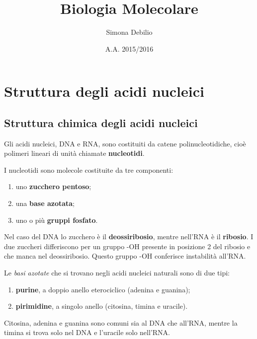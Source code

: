 \documentclass[11pt]{book}
\title{\textbf{Biologia Molecolare}}
\author{Simona Debilio}
\date{A.A. 2015/2016}
\date{}
\begin{document}
\maketitle

\tableofcontents


\chapter{Struttura degli acidi
nucleici}\label{struttura-degli-acidi-nucleici}

\section{Struttura chimica degli acidi
nucleici}\label{struttura-chimica-degli-acidi-nucleici}

Gli acidi nucleici, DNA e RNA, sono costituiti da catene
polinucleotidiche, cioè polimeri lineari di unità chiamate
\textbf{nucleotidi}.

I nucleotidi sono molecole costituite da tre componenti:

\begin{enumerate}
\def\labelenumi{\arabic{enumi}.}
\itemsep1pt\parskip0pt
\item
  uno \textbf{zucchero pentoso};
\item
  una \textbf{base azotata};
\item
  uno o più \textbf{gruppi fosfato}.
\end{enumerate}

Nel caso del DNA lo zucchero è il \textbf{deossiribosio}, mentre
nell'RNA è il \textbf{ribosio}. I due zuccheri differiscono per un
gruppo -OH presente in posizione 2 del ribosio e che manca nel
deossiribosio. Questo gruppo -OH conferisce instabilità all'RNA.

Le \emph{basi azotate} che si trovano negli acidi nucleici naturali sono
di due tipi:

\begin{enumerate}
\def\labelenumi{\arabic{enumi}.}
\itemsep1pt\parskip0pt
\item
  \textbf{purine}, a doppio anello eterociclico (adenina e guanina);
\item
  \textbf{pirimidine}, a singolo anello (citosina, timina e uracile).
\end{enumerate}

Citosina, adenina e guanina sono comuni sia al DNA che all'RNA, mentre
la timina si trova solo nel DNA e l'uracile solo nell'RNA.
\end{document}

